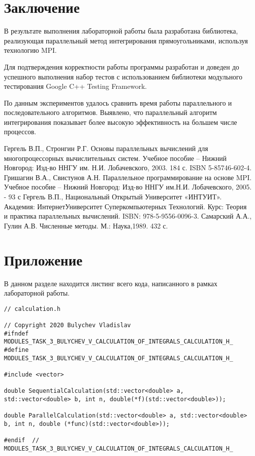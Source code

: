 \documentclass{report}
\begin{document}
\section*{Заключение}
В результате выполнения лабораторной работы была разработана библиотека, реализующая параллельный метод интегрирования прямоугольниками, используя технологию MPI.
\par Для подтверждения корректности работы программы разработан и доведен до успешного выполнения набор тестов с использованием библиотеки модульного тестирования Google C++ Testing Framework.
\par По данным экспериментов удалось сравнить время работы параллельного и последовательного алгоритмов. Выявлено, что параллельный алгоритм интегрирования показывает более высокую эффективность на большем числе процессов.
\newpage

\begin{thebibliography}{1}
 Гергель В.П., Стронгин Р.Г. Основы параллельных вычислений для многопроцессорных вычислительных систем. Учебное пособие – Нижний Новгород: Изд-во ННГУ им. Н.И. Лобачевского, 2003. 184 с. ISBN 5-85746-602-4.
 Гришагин В.А., Свистунов А.Н. Параллельное программирование на основе MPI. Учебное пособие – Нижний Новгород: Изд-во ННГУ им.Н.И. Лобачевского, 2005. - 93 с
 Гергель В.П., Национальный Открытый Университет «ИНТУИТ». Академия: ИнтернетУниверситет Суперкомпьютерных Технологий. Курс: Теория и практика параллельных вычислений. ISBN: 978-5-9556-0096-3.
 Самарский А.А., Гулин А.В. Численные методы. М.: Наука,1989. 432 с.
\end{thebibliography}
\newpage

\section*{Приложение}
В данном разделе находится листинг всего кода, написанного в рамках лабораторной работы.
\begin{lstlisting}
// calculation.h

// Copyright 2020 Bulychev Vladislav
#ifndef MODULES_TASK_3_BULYCHEV_V_CALCULATION_OF_INTEGRALS_CALCULATION_H_
#define MODULES_TASK_3_BULYCHEV_V_CALCULATION_OF_INTEGRALS_CALCULATION_H_

#include <vector>

double SequentialCalculation(std::vector<double> a, std::vector<double> b, int n, double(*f)(std::vector<double>));

double ParallelCalculation(std::vector<double> a, std::vector<double> b, int n, double (*func)(std::vector<double>));

#endif  // MODULES_TASK_3_BULYCHEV_V_CALCULATION_OF_INTEGRALS_CALCULATION_H_
\end{lstlisting}
\end{document}
